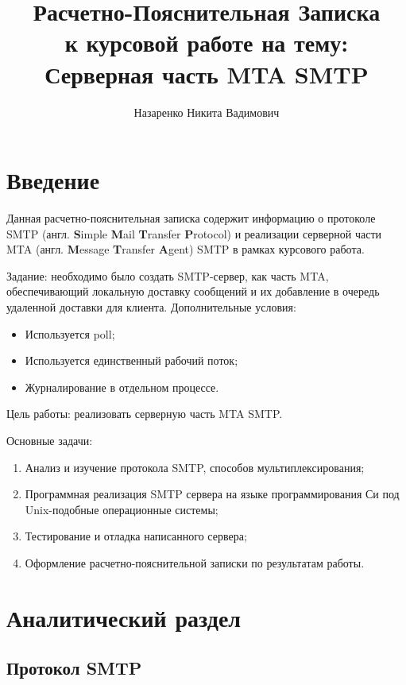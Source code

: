 \documentclass[a4paper,12pt]{report}
\title{Расчетно-Пояснительная Записка \\ 
    \large к курсовой работе на тему: \\ Серверная часть MTA SMTP}
\author{Назаренко Никита Вадимович}
\begin{document}
\maketitle


\tableofcontents

\clearpage
\chapter*{Введение}

Данная расчетно-пояснительная записка содержит информацию о протоколе SMTP (англ. \textbf{S}imple \textbf{M}ail \textbf{T}ransfer \textbf{P}rotocol) и реализации серверной части MTA (англ. \textbf{M}essage \textbf{T}ransfer \textbf{A}gent) SMTP в рамках курсового работа.

Задание: необходимо было создать SMTP-сервер, как часть MTA, обеспечивающий локальную доставку сообщений и их добавление в очередь удаленной доставки для клиента. Дополнительные условия:
\begin{itemize}
\item Используется poll;
\item Используется единственный рабочий поток;
\item Журналирование в отдельном процессе.
\end{itemize}

Цель работы: реализовать серверную часть MTA SMTP.

Основные задачи:
\begin{enumerate}
    \item Анализ и изучение протокола SMTP, способов мультиплексирования;
    \item Программная реализация SMTP сервера на языке программирования Си под Unix-подобные операционные системы;
    \item Тестирование и отладка написанного сервера;
    \item Оформление расчетно-пояснительной записки по результатам работы.
\end{enumerate}


\chapter{Аналитический раздел}


\section{Протокол SMTP}
\end{document}
